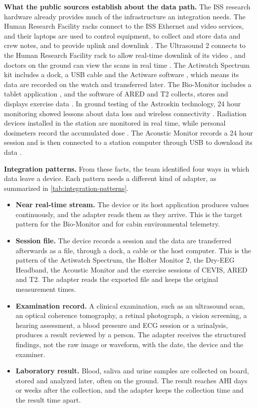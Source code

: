 \medskip\noindent\textbf{What the public sources establish about the data path.} The ISS research hardware already provides much of the infrastructure an integration needs. The Human Research Facility racks connect to the ISS Ethernet and video services, and their laptops are used to control equipment, to collect and store data and crew notes, and to provide uplink and downlink \cite{nasa_issmp_hardware}. The Ultrasound 2 connects to the Human Research Facility rack to allow real-time downlink of its video \cite{nasa_issmp_hardware}, and doctors on the ground can view the scans in real time \cite{nasa_ultrasound_2025}. The Actiwatch Spectrum kit includes a dock, a USB cable and the Actiware software \cite{nasa_issmp_hardware}, which means its data are recorded on the watch and transferred later. The Bio-Monitor includes a tablet application \cite{canadian_space_agency_biomonitor}, and the software of ARED and T2 collects, stores and displays exercise data \cite{nasa_jsc_exercise_countermeasures}. In ground testing of the Astroskin technology, 24 hour monitoring showed lessons about data loss and wireless connectivity \cite{toscano2017astroskin}. Radiation devices installed in the station are monitored in real time, while personal dosimeters record the accumulated dose \cite{jaxa_medops_system}. The Acoustic Monitor records a 24 hour session and is then connected to a station computer through USB to download its data \cite{limardo2021noise}.

\medskip\noindent\textbf{Integration patterns.} From these facts, the team identified four ways in which data leave a device. Each pattern needs a different kind of adapter, as summarized in \ref{tab:integration-patterns}.

\begin{itemize}
\item \textbf{Near real-time stream.} The device or its host application produces values continuously, and the adapter reads them as they arrive. This is the target pattern for the Bio-Monitor and for cabin environmental telemetry.
\item \textbf{Session file.} The device records a session and the data are transferred afterwards as a file, through a dock, a cable or the host computer. This is the pattern of the Actiwatch Spectrum, the Holter Monitor 2, the Dry-EEG Headband, the Acoustic Monitor and the exercise sessions of CEVIS, ARED and T2. The adapter reads the exported file and keeps the original measurement times.
\item \textbf{Examination record.} A clinical examination, such as an ultrasound scan, an optical coherence tomography, a retinal photograph, a vision screening, a hearing assessment, a blood pressure and ECG session or a urinalysis, produces a result reviewed by a person. The adapter receives the structured findings, not the raw image or waveform, with the date, the device and the examiner.
\item \textbf{Laboratory result.} Blood, saliva and urine samples are collected on board, stored and analyzed later, often on the ground. The result reaches AHI days or weeks after the collection, and the adapter keeps the collection time and the result time apart.
\end{itemize}

